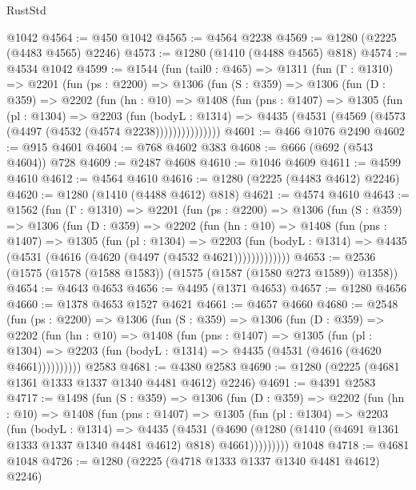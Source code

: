 \begin{lexlean}{RustStd}
\begin{coremodule}
{\begin{coremodule}
{{{{{{{{{{{{    @1042
@4564 := @450 @1042
@4565 := @4564 @2238
@4569 := @1280 (@2225 (@4483 @4565) @2246)
@4573 := @1280 (@1410 (@4488 @4565) @818)
@4574 := @4534 @1042
@4599 := @1544
    (fun (tail0 : @465) =>
    @1311
      (fun (Γ : @1310) =>
      @2201
        (fun (ps : @2200) =>
        @1306
          (fun (S : @359) =>
          @1306
            (fun (D : @359) =>
            @2202
              (fun (hn : @10) =>
              @1408
                (fun (pns : @1407) =>
                @1305
                  (fun (pl : @1304) =>
                  @2203
                    (fun (bodyL : @1314) =>
                    @4435 (@4531 (@4569 (@4573 (@4497 (@4532 (@4574 @2238)))))))))))))))
@4601 := @466 @1076 @2490
@4602 := @915 @4601
@4604 := @768 @4602 @383
@4608 := @666 (@692 (@543 @4604)) @728
@4609 := @2487 @4608
@4610 := @1046 @4609
@4611 := @4599 @4610
@4612 := @4564 @4610
@4616 := @1280 (@2225 (@4483 @4612) @2246)
@4620 := @1280 (@1410 (@4488 @4612) @818)
@4621 := @4574 @4610
@4643 := @1562
    (fun (Γ : @1310) =>
    @2201
      (fun (ps : @2200) =>
      @1306
        (fun (S : @359) =>
        @1306
          (fun (D : @359) =>
          @2202
            (fun (hn : @10) =>
            @1408
              (fun (pns : @1407) =>
              @1305
                (fun (pl : @1304) =>
                @2203
                  (fun (bodyL : @1314) =>
                  @4435 (@4531 (@4616 (@4620 (@4497 (@4532 @4621)))))))))))))
@4653 := @2536 (@1575 (@1578 (@1588 @1583)) (@1575 (@1587 (@1580 @273 @1589)) @1358))
@4654 := @4643 @4653
@4656 := @4495 (@1371 @4653)
@4657 := @1280 @4656
@4660 := @1378 @4653 @1527 @4621
@4661 := @4657 @4660
@4680 := @2548
    (fun (ps : @2200) =>
    @1306
      (fun (S : @359) =>
      @1306
        (fun (D : @359) =>
        @2202
          (fun (hn : @10) =>
          @1408
            (fun (pns : @1407) =>
            @1305
              (fun (pl : @1304) =>
              @2203 (fun (bodyL : @1314) => @4435 (@4531 (@4616 (@4620 @4661))))))))))
    @2583
@4681 := @4380 @2583
@4690 := @1280 (@2225 (@4681 @1361 @1333 @1337 @1340 @4481 @4612) @2246)
@4691 := @4391 @2583
@4717 := @1498
    (fun (S : @359) =>
    @1306
      (fun (D : @359) =>
      @2202
        (fun (hn : @10) =>
        @1408
          (fun (pns : @1407) =>
          @1305
            (fun (pl : @1304) =>
            @2203
              (fun (bodyL : @1314) =>
              @4435
                (@4531
                  (@4690
                    (@1280 (@1410 (@4691 @1361 @1333 @1337 @1340 @4481 @4612) @818) @4661)))))))))
    @1048
@4718 := @4681 @1048
@4726 := @1280 (@2225 (@4718 @1333 @1337 @1340 @4481 @4612) @2246)
}}}}}}}}}}}}
\end{coremodule}}
\end{coremodule}
\end{lexlean}
